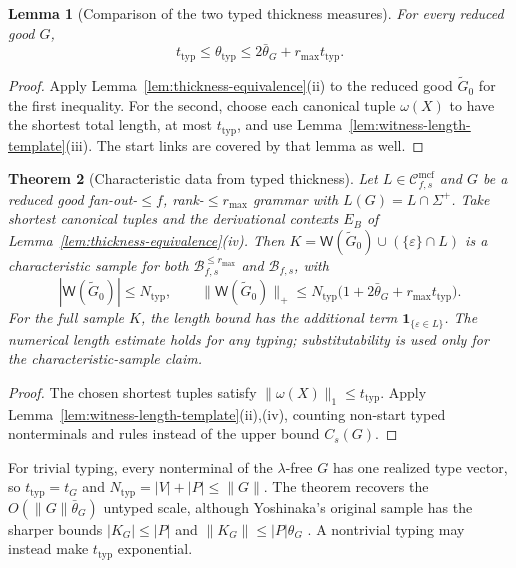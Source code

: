 \documentclass[11pt]{article}
\numberwithin{equation}{section}
\theoremstyle{plain}
\newtheorem{theorem}{Theorem}[section]
\newtheorem{lemma}[theorem]{Lemma}
\theoremstyle{definition}
\theoremstyle{remark}
\newcommand{\Wit}{\mathsf{W}}
\newcommand{\Cmcf}[2]{\mathcal{C}^{\mathrm{mcf}}_{#1,#2}}
\newcommand{\eps}{\varepsilon}
\begin{document}
\begin{lemma}[Comparison of the two typed thickness measures]
\label{lem:typed-thickness-equivalence}
For every reduced good $G$,
\[
 t_{\mathrm{typ}}\le\theta_{\mathrm{typ}}
 \le 2\bar\theta_G+r_{\max}t_{\mathrm{typ}}.
\]
\end{lemma}

\begin{proof}
Apply Lemma~\ref{lem:thickness-equivalence}(ii) to the reduced good
$\widetilde G_0$ for the first inequality.  For the second, choose each
canonical tuple $\omega(X)$ to have the shortest total length, at most
$t_{\mathrm{typ}}$, and use Lemma~\ref{lem:witness-length-template}(iii).
The start links are covered by that lemma as well.
\end{proof}

\begin{theorem}[Characteristic data from typed thickness]
\label{thm:data-from-typed-thickness}
Let $L\in\Cmcf{f}{s}$ and $G$ be a reduced good fan-out-$\le f$,
rank-$\le r_{\max}$ grammar with $L(G)=L\cap\Sigma^+$.
Take shortest canonical tuples and the derivational contexts $E_B$ of
Lemma~\ref{lem:thickness-equivalence}(iv).  Then
$K=\Wit(\widetilde G_0)\cup(\{\eps\}\cap L)$ is a characteristic sample
for both $\mathcal B^{\le r_{\max}}_{f,s}$ and $\mathcal B_{f,s}$, with
\[
 |\Wit(\widetilde G_0)|\le N_{\mathrm{typ}},\qquad
 \|\Wit(\widetilde G_0)\|_+\le
 N_{\mathrm{typ}}\bigl(1+2\bar\theta_G+r_{\max}t_{\mathrm{typ}}\bigr).
\]
For the full sample $K$, the length bound has the additional term
$\mathbf 1_{\{\eps\in L\}}$.  The numerical length estimate holds for
any typing; substitutability is used only for the characteristic-sample claim.
\end{theorem}

\begin{proof}
The chosen shortest tuples satisfy
$\|\omega(X)\|_1\le t_{\mathrm{typ}}$.  Apply
Lemma~\ref{lem:witness-length-template}(ii),(iv), counting non-start typed
nonterminals and rules instead of the upper bound $C_s(G)$.
\end{proof}

For trivial typing, every nonterminal of the $\lambda$-free $G$ has one
realized type vector, so $t_{\mathrm{typ}}=t_G$ and
$N_{\mathrm{typ}}=|V|+|P|\le\|G\|$.  The theorem recovers the
$O(\|G\|\bar\theta_G)$ untyped scale, although Yoshinaka's original
sample has the sharper bounds $|K_G|\le|P|$ and
$\|K_G\|\le|P|\theta_G$ \cite[Lemma~7 and Theorem~1]{Yoshinaka2011}.
A nontrivial typing may instead make $t_{\mathrm{typ}}$ exponential.
\end{document}
